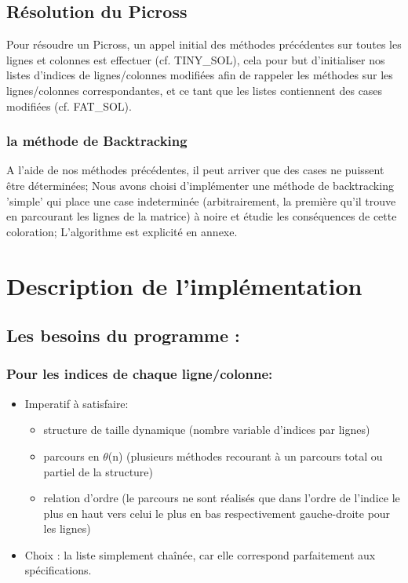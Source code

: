 \documentclass{article}
\begin{document}
\subsection{Résolution du Picross}
Pour résoudre un Picross, un appel initial des méthodes précédentes sur toutes les lignes et colonnes est effectuer (cf. TINY\_SOL), cela pour but d'initialiser nos listes d'indices de lignes/colonnes modifiées afin de rappeler les méthodes sur les lignes/colonnes correspondantes, et ce tant que les listes contiennent des cases modifiées (cf. FAT\_SOL).
\subsubsection{la méthode de Backtracking}
A l'aide de nos méthodes précédentes, il peut arriver que des cases ne puissent être déterminées;\newline
Nous avons choisi d'implémenter une méthode de backtracking 'simple' qui place une case indeterminée (arbitrairement, la première qu'il trouve en parcourant les lignes de la matrice) à noire et étudie les conséquences de cette coloration;
L'algorithme est explicité en annexe.
\section{Description de l'implémentation}
\subsection{Les besoins du programme :}
\subsubsection{Pour les indices de chaque ligne/colonne:}
\begin{itemize}
\item Imperatif à satisfaire:
\begin{itemize}
\item structure de taille dynamique (nombre variable d'indices par lignes)
\item parcours en $\theta$(n) (plusieurs méthodes recourant à un parcours total ou partiel de la structure)
\item relation d'ordre (le parcours ne sont réalisés que dans l'ordre de l'indice le plus en haut vers celui le plus en bas respectivement gauche-droite pour les lignes)
\end{itemize}
\item Choix : la liste simplement chaînée, car elle correspond parfaitement aux spécifications.
\end{itemize}
\end{document}
